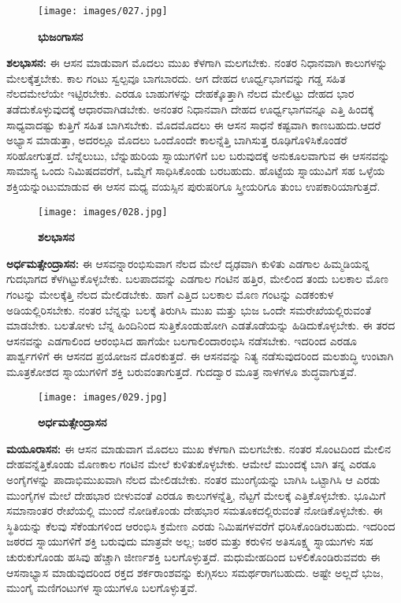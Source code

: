 \begin{figure}
\texttt{[image: images/027.jpg]}
\caption{\textbf{ಭುಜಂಗಾಸನ} }
\end{figure}

\textbf{  ಶಲಭಾಸನ:} ಈ ಆಸನ ಮಾಡುವಾಗ ಮೊದಲು ಮುಖ ಕೆಳಗಾಗಿ ಮಲಗಬೇಕು. ನಂತರ ನಿಧಾನವಾಗಿ ಕಾಲುಗಳನ್ನು ಮೇಲಕ್ಕೆತ್ತಬೇಕು. ಕಾಲ ಗಂಟು ಸ್ವಲ್ಪವೂ ಬಾಗಬಾರದು. ಆಗ ದೇಹದ ಊರ್ಧ್ವಭಾಗವನ್ನು ಗಡ್ಡ ಸಹಿತ ನೆಲದಮೇಲೆಯೇ ಇಟ್ಟಿರಬೇಕು. ಎರಡೂ ಬಾಹುಗಳನ್ನು ದೇಹಕ್ಕೊತ್ತಾಗಿ ನೆಲದ ಮೇಲಿಟ್ಟು ದೇಹದ ಭಾರ ತಡೆದುಕೊಳ್ಳುವುದಕ್ಕೆ ಆಧಾರವಾಗಿಡಬೇಕು. ಅನಂತರ ನಿಧಾನವಾಗಿ ದೇಹದ ಊರ್ಧ್ವಭಾಗವನ್ನೂ ಎತ್ತಿ ಹಿಂದಕ್ಕೆ ಸಾಧ್ಯವಾದಷ್ಟು ಕುತ್ತಿಗೆ ಸಹಿತ ಬಾಗಿಸಬೇಕು. ಮೊದಮೊದಲು ಈ ಆಸನ ಸಾಧನೆ ಕಷ್ಟವಾಗಿ ಕಾಣಬಹುದು.ಆದರೆ ಅಭ್ಯಾಸ ಮಾಡುತ್ತಾ, ಅದರಲ್ಲೂ ಮೊದಲು ಒಂದೊಂದೇ ಕಾಲನ್ನೆತ್ತಿ ಬಾಗಿಸುತ್ತ ರೂಢಿಗೊಳಿಸಿಕೊಂಡರೆ ಸರಿಹೋಗುತ್ತದೆ. ಬೆನ್ನೆಲುಬು, ಬೆನ್ನುಹುರಿಯ ಸ್ನಾಯುಗಳಿಗೆ ಬಲ ಬರುವುದಕ್ಕೆ ಅನುಕೂಲವಾಗುವ ಈ ಆಸನವನ್ನು ಸಾಮಾನ್ಯ ಒಂದು ನಿಮಿಷದವರೆಗೆ, ಒಮ್ಮೆಗೆ ಸಾಧಿಸಿಕೊಂಡು ಬರಬಹುದು. ಹೊಟ್ಟೆಯ ಸ್ನಾಯುವಿಗೆ ಸಹ ಒಳ್ಳೆಯ ಶಕ್ತಿಯನ್ನುಂಟುಮಾಡುವ ಈ ಆಸನ ಮಧ್ಯ ವಯಸ್ಸಿನ ಪುರುಷರಿಗೂ ಸ್ತ್ರೀಯರಿಗೂ ತುಂಬ ಉಪಕಾರಿಯಾಗುತ್ತದೆ.

\begin{figure}
\texttt{[image: images/028.jpg]}
\caption{\textbf{ಶಲಭಾಸನ} }
\end{figure}

\textbf{  ಅರ್ಧಮತ್ಸೇಂದ್ರಾಸನ:} ಈ ಆಸವನ್ನಾರಂಭಿಸುವಾಗ ನೆಲದ ಮೇಲೆ ದೃಢವಾಗಿ ಕುಳಿತು ಎಡಗಾಲ ಹಿಮ್ಮಡಿಯನ್ನ ಗುದಭಾಗದ ಕೆಳಗಿಟ್ಟುಕೊಳ್ಳಬೇಕು. ಬಲಪಾದವನ್ನು ಎಡಗಾಲ ಗಂಟಿನ ಹತ್ತಿರ, ಮೇಲಿಂದ ತಂದು ಬಲಕಾಲ ಮೊಣ ಗಂಟನ್ನು ಮೇಲಕ್ಕೆತ್ತಿ ನೆಲದ ಮೇಲಿಡಬೇಕು. ಹಾಗೆ ಎತ್ತಿದ ಬಲಕಾಲ ಮೊಣ ಗಂಟನ್ನು ಎಡಕಂಕುಳ ಅಡಿಯಲ್ಲಿರಿಸಬೇಕು. ನಂತರ ಬೆನ್ನನ್ನು ಬಲಕ್ಕೆ ತಿರುಗಿಸಿ ಮುಖ ಮತ್ತು ಭುಜ ಒಂದೇ ಸಮರೇಖೆಯಲ್ಲಿರುವಂತೆ ಮಾಡಬೇಕು. ಬಲತೋಳು ಬೆನ್ನ ಹಿಂದಿನಿಂದ ಸುತ್ತಿಕೊಂಡುಹೋಗಿ ಎಡತೊಡೆಯನ್ನು ಹಿಡಿದುಕೊಳ್ಳಬೇಕು. ಈ ತರದ ಆಸನವನ್ನು ಎಡಗಾಲಿಂದ ಆರಂಭಿಸಿದ ಹಾಗೆಯೇ ಬಲಗಾಲಿಂದಾರಂಭಿಸಿ ನಡೆಸಬೇಕು. ಇದರಿಂದ ಎರಡೂ ಪಾರ್ಶ್ವಗಳಿಗೆ ಈ ಆಸನದ ಪ್ರಯೋಜನ ದೊರಕುತ್ತದೆ. ಈ ಆಸನವನ್ನು ನಿತ್ಯ ನಡೆಸುವುದರಿಂದ ಮಲಶುದ್ಧಿ ಉಂಟಾಗಿ ಮೂತ್ರಕೋಶದ ಸ್ನಾಯುಗಳಿಗೆ ಶಕ್ತಿ ಬರುವಂತಾಗುತ್ತದೆ. ಗುದದ್ವಾರ ಮೂತ್ರ ನಾಳಗಳೂ ಶುದ್ಧವಾಗುತ್ತವೆ.

\begin{figure}
\texttt{[image: images/029.jpg]}
\caption{\textbf{ಅರ್ಧಮತ್ಸೇಂದ್ರಾಸನ} }
\end{figure}

\textbf{  ಮಯೂರಾಸನ:} ಈ ಆಸನ ಮಾಡುವಾಗ ಮೊದಲು ಮುಖ ಕೆಳಗಾಗಿ ಮಲಗಬೇಕು. ನಂತರ ಸೊಂಟದಿಂದ ಮೇಲಿನ ದೇಹವನ್ನೆತ್ತಿಕೊಂಡು ಮೊಣಕಾಲ ಗಂಟಿನ ಮೇಲೆ ಕುಳಿತುಕೊಳ್ಳಬೇಕು. ಆಮೇಲೆ ಮುಂದಕ್ಕೆ ಬಾಗಿ ತನ್ನ ಎರಡೂ ಅಂಗೈಗಳನ್ನು ಪಾದಾಭಿಮುಖವಾಗಿ ನೆಲದ ಮೇಲಿಡಬೇಕು. ನಂತರ ಮುಂಗೈಯನ್ನು ಬಾಗಿಸಿ ಒಟ್ಟಾಗಿಸಿ ಆ ಎರಡು ಮುಂಗೈಗಳ ಮೇಲೆ ದೇಹಭಾರ ಬೀಳುವಂತೆ ಎರಡೂ ಕಾಲುಗಳನ್ನೆತ್ತಿ, ನೆಟ್ಟಗೆ ಮೇಲಕ್ಕೆ ಎತ್ತಿಕೊಳ್ಳಬೇಕು. ಭೂಮಿಗೆ ಸಮಾನಾಂತರ ರೇಖೆಯಲ್ಲಿ ಮುಂದೆ ನೋಡಿಕೊಂಡು ದೇಹಭಾರ ಸಮತೂಕದಲ್ಲಿರುವಂತೆ ನೋಡಿಕೊಳ್ಳಬೇಕು. ಈ ಸ್ಥಿತಿಯನ್ನು ಕೆಲವು ಸೆಕೆಂಡುಗಳಿಂದ ಆರಂಭಿಸಿ ಕ್ರಮೇಣ ಎರಡು ನಿಮಿಷಗಳವರೆಗೆ ಧರಿಸಿಕೊಂಡಿರಬಹುದು. ಇದರಿಂದ ಜಠರದ ಸ್ನಾಯುಗಳಿಗೆ ಶಕ್ತಿ ಬರುವುದು ಮಾತ್ರವೇ ಅಲ್ಲ; ಜಠರ ಮತ್ತು ಕರುಳಿನ ಅತಿಸೂಕ್ಷ್ಮ ಸ್ನಾಯುಗಳು ಸಹ ಚುರುಕುಗೊಂಡು ಹಸಿವು ಹೆಚ್ಚಾಗಿ ಜೀರ್ಣಶಕ್ತಿ ಬಲಗೊಳ್ಳುತ್ತದೆ. ಮಧುಮೇಹದಿಂದ ಬಳಲಿಕೊಂಡಿರುವವರು ಈ ಆಸನಾಭ್ಯಾಸ ಮಾಡುವುದರಿಂದ ರಕ್ತದ ಶರ್ಕರಾಂಶವನ್ನು ಕುಗ್ಗಿಸಲು ಸಮರ್ಥರಾಗಬಹುದು. ಅಷ್ಟೇ ಅಲ್ಲದೆ ಭುಜ, ಮುಂಗೈ ಮಣಿಗಂಟುಗಳ ಸ್ನಾಯುಗಳೂ ಬಲಗೊಳ್ಳುತ್ತವೆ.

